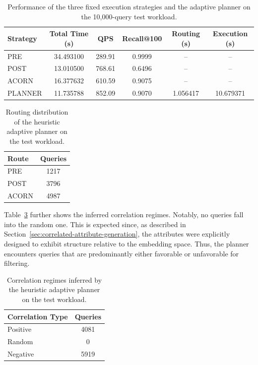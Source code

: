 \begin{table}[H]
    \centering
    \renewcommand{\arraystretch}{1.15}
    \begin{tabular}{lccccc}
        \toprule
        Strategy & Total Time (s) & QPS & Recall@100 & Routing (s) & Execution (s) \\
        \midrule
        PRE     & 34.493100 & 289.91 & 0.9999 & --       & --        \\
        POST    & 13.010500 & 768.61 & 0.6496 & --       & --        \\
        ACORN   & 16.377632 & 610.59 & 0.9075 & --       & --        \\
        PLANNER & 11.735788 & 852.09 & 0.9070 & 1.056417 & 10.679371 \\
        \bottomrule
    \end{tabular}
    \caption{Performance of the three fixed execution strategies and the adaptive planner on the 10{,}000-query test workload.}
    \label{tab:test-set-strategy-metrics}
\end{table}

\begin{table}[H]
    \centering
    \renewcommand{\arraystretch}{1.15}
    \begin{tabular}{lc}
        \toprule
        Route & Queries \\
        \midrule
        PRE   & 1217 \\
        POST  & 3796 \\
        ACORN & 4987 \\
        \bottomrule
    \end{tabular}
    \caption{Routing distribution of the heuristic adaptive planner on the test workload.}
    \label{tab:planner-routing-test}
\end{table}

Table~\ref{tab:planner-correlation-test} further shows the inferred correlation regimes. 
Notably, no queries fall into the random one. This is expected since, as described in Section~\ref{sec:correlated-attribute-generation}, the attributes were explicitly designed to exhibit structure relative to the embedding space. 
Thus, the planner encounters queries that are predominantly either favorable or unfavorable for filtering.
\begin{table}[H]
    \centering
    \renewcommand{\arraystretch}{1.15}
    \begin{tabular}{lc}
        \toprule
        Correlation Type & Queries \\
        \midrule
        Positive & 4081 \\
        Random   & 0    \\
        Negative & 5919 \\
        \bottomrule
    \end{tabular}
    \caption{Correlation regimes inferred by the heuristic adaptive planner on the test workload.}
    \label{tab:planner-correlation-test}
\end{table}

